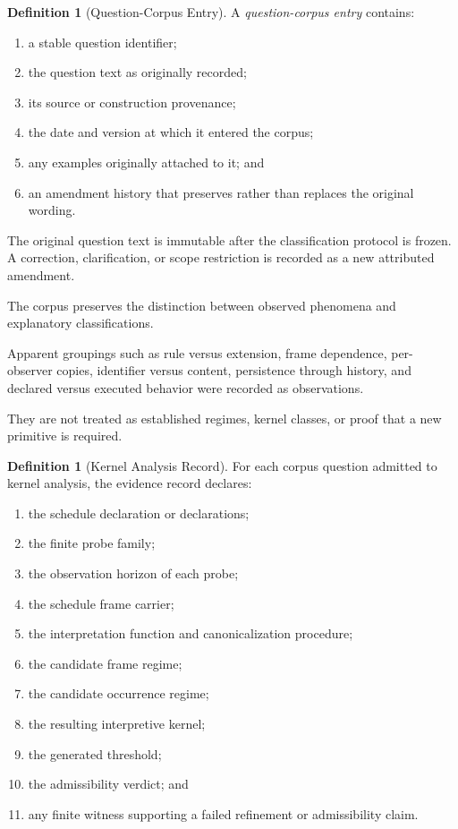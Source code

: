\documentclass[11pt]{article}
\theoremstyle{plain}
\theoremstyle{definition}
\newtheorem{definition}[theorem]{Definition}
\theoremstyle{remark}
\begin{document}
\begin{definition}[Question-Corpus Entry]
  \label{ik.def.corpus-entry}
  A \emph{question-corpus entry}
  contains:
  \begin{enumerate}[label=(\alph*)]
    \item a stable question identifier;
    \item the question text as originally recorded;
    \item its source or construction provenance;
    \item the date and version at which it entered the corpus;
    \item any examples originally attached to it; and
    \item an amendment history
          that preserves rather than replaces
          the original wording.
  \end{enumerate}
\end{definition}

The original question text is immutable
after the classification protocol is frozen.
A correction,
clarification,
or scope restriction
is recorded as a new attributed amendment.

The corpus preserves the distinction
between observed phenomena
and explanatory classifications.

Apparent groupings such as
rule versus extension,
frame dependence,
per-observer copies,
identifier versus content,
persistence through history,
and declared versus executed behavior
were recorded as observations.

They are not treated as established regimes,
kernel classes,
or proof that a new primitive is required.

\begin{definition}[Kernel Analysis Record]
  \label{ik.def.kernel-analysis-record}
  For each corpus question admitted
  to kernel analysis,
  the evidence record declares:
  \begin{enumerate}[label=(\alph*)]
    \item the schedule declaration or declarations;
    \item the finite probe family;
    \item the observation horizon of each probe;
    \item the schedule frame carrier;
    \item the interpretation function
          and canonicalization procedure;
    \item the candidate frame regime;
    \item the candidate occurrence regime;
    \item the resulting interpretive kernel;
    \item the generated threshold;
    \item the admissibility verdict; and
    \item any finite witness
          supporting a failed refinement
          or admissibility claim.
  \end{enumerate}
\end{definition}
\end{document}
